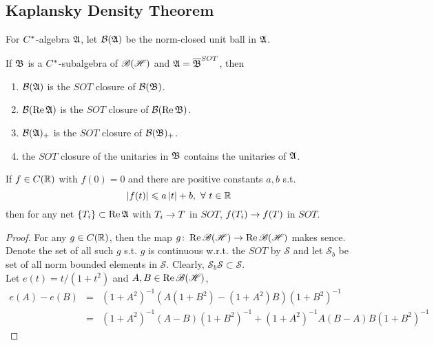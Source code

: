 \documentclass[a4paper,11pt]{report}
\begin{document}
\subsection{Kaplansky Density Theorem}

For $C^{*}$-algebra $\mathfrak{A}$, let $\mathcal{B}(\mathfrak{A})$ be the norm-closed unit ball in $\mathfrak{A}$.

\begin{thm}
	If $\mathfrak{B}$ is a $C^{*}$-subalgebra of $\mathscr{B(H)}$ and $\mathfrak{A} = \overline{\mathfrak{B}}^{SOT}$, then 
	\begin{enumerate}[label = \arabic*)]
		\item $\mathcal{B}(\mathfrak{A})$ is the $SOT$ closure of $\mathcal{B}(\mathfrak{B})$.
		\item $\mathcal{B}(\operatorname{Re}{\mathfrak{A}})$ is the $SOT$ closure of $\mathcal{B}(\operatorname{Re}{\mathfrak{B}})$.
		\item $\mathcal{B}(\mathfrak{A})_{+}$ is the $SOT$ closure of $\mathcal{B}(\mathfrak{B})_{+}$.
		\item the $SOT$ closure of the unitaries in $\mathfrak{B}$ contains the unitaries of $\mathfrak{A}$.
	\end{enumerate}
\end{thm}

\begin{lem}
	If $f \in C(\mathbb{R})$ with $f(0)=0$ and there are positive constants $a,b$ s.t. 
	\begin{equation*}
		\left\lvert f(t)\right\lvert \leqslant a\left\lvert t\right\lvert + b,~ \forall~ t \in \mathbb{R}
	\end{equation*}
	then for any net $\{T_i\} \subset \operatorname{Re}{\mathfrak{A}}$ with $T_i \rightarrow T$ in $SOT$, $f(T_i) \rightarrow f(T)$ in $SOT$.
\end{lem}
\begin{proof}
	For any $g \in C(\mathbb{R})$, then the map $g \colon \operatorname{Re}{\mathscr{B(H)}} \rightarrow \operatorname{Re}{\mathscr{B(H)}}$ makes sence. Denote the set of all such $g$ s.t. $g$ is continuous w.r.t. the $SOT$ by $\mathcal{S}$ and let $\mathcal{S}_b$ be set of all norm bounded elements in $\mathcal{S}$. Clearly, $\mathcal{S}_b \mathcal{S} \subset \mathcal{S}$.\\
	Let $e(t) = t / (1+t^2)$ and $A,B \in \operatorname{Re}{\mathscr{B(H)}}$,
	\begin{eqnarray*}
		e(A)-e(B) &=& (1+A^2)^{-1}(A(1+B^2)-(1+A^2)B)(1+B^2)^{-1} \\
		&=& (1+A^2)^{-1}(A-B)(1+B^2)^{-1} + (1+A^2)^{-1}A(B-A)B(1+B^2)^{-1}
	\end{eqnarray*}
\end{proof}
\end{document}
